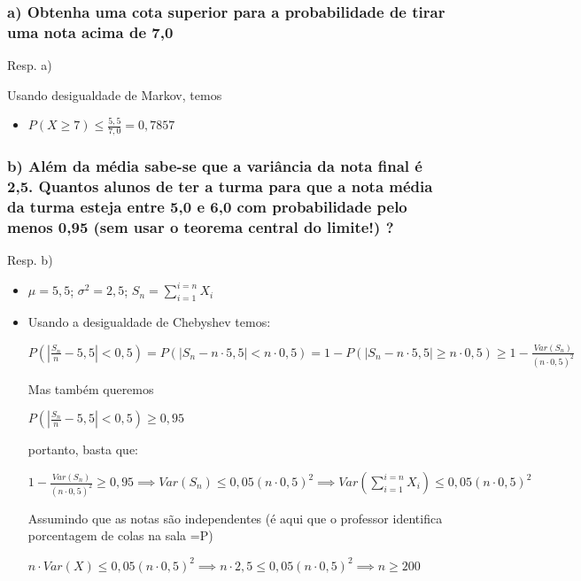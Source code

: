 \documentclass[english]{article}
\begin{document}
\subsubsection*{\textmd{a) Obtenha uma cota superior para a probabilidade de tirar
uma nota acima de 7,0}}

Resp. a)

Usando desigualdade de Markov, temos
\begin{itemize}
\item $P(X\ge7)\le\frac{5,5}{7,0}=0,7857$
\end{itemize}

\subsubsection*{\textmd{b) Além da média sabe-se que a variância da nota final é
2,5. Quantos alunos de ter a turma para que a nota média da turma
esteja entre 5,0 e 6,0 com probabilidade pelo menos 0,95 (sem usar
o teorema central do limite!) ?}}

Resp. b)
\begin{itemize}
\item $\mu=5,5$; $\sigma^{2}=2,5$; $S_{n}=\sum_{i=1}^{i=n}X_{i}$
\item Usando a desigualdade de Chebyshev temos:


$P(\left|\frac{S_{n}}{n}-5,5\right|<0,5)=P(\left|S_{n}-n\cdot5,5\right|<n\cdot0,5)=1-P(\left|S_{n}-n\cdot5,5\right|\ge n\cdot0,5)\ge1-\frac{Var(S_{n})}{(n\cdot0,5)^{2}}$


Mas também queremos


$P(\left|\frac{S_{n}}{n}-5,5\right|<0,5)\ge0,95$


portanto, basta que:


$1-\frac{Var(S_{n})}{(n\cdot0,5)^{2}}\ge0,95\implies Var(S_{n})\le0,05(n\cdot0,5)^{2}\implies Var(\sum_{i=1}^{i=n}X_{i})\le0,05(n\cdot0,5)^{2}$


Assumindo que as notas são independentes (é aqui que o professor identifica
porcentagem de colas na sala =P)


$n\cdot Var(X)\le0,05(n\cdot0,5)^{2}\implies n\cdot2,5\le0,05(n\cdot0,5)^{2}\implies n\ge200$

\end{itemize}

\subsection*{\textcompwordmark{}}
\end{document}
